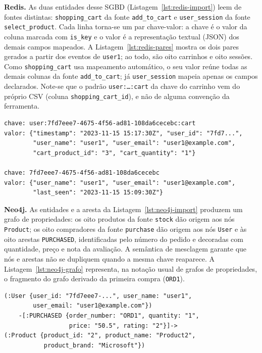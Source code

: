 \textbf{Redis.} As duas entidades desse SGBD (Listagem~\ref{lst:redis-import}) leem de
fontes distintas: \texttt{shopping\_cart} da fonte \texttt{add\_to\_cart} e
\texttt{user\_session} da fonte \texttt{select\_product}. Cada linha torna-se um par
chave-valor: a chave é o valor da coluna marcada com \texttt{is\_key} e o valor é a
representação textual (JSON) dos demais campos mapeados. A Listagem~\ref{lst:redis-pares}
mostra os dois pares gerados a partir dos eventos de \texttt{user1}; ao todo, são oito
carrinhos e oito sessões. Como \texttt{shopping\_cart} usa mapeamento automático, o seu
valor reúne todas as demais colunas da fonte \texttt{add\_to\_cart}; já
\texttt{user\_session} mapeia apenas os campos declarados. Note-se que o padrão
\texttt{user:\ldots:cart} da chave do carrinho vem do próprio CSV (coluna
\texttt{shopping\_cart\_id}), e não de alguma convenção da ferramenta.

\begin{lstlisting}[style=textstyle,caption={Pares chave-valor gerados no Redis a partir dos eventos de \texttt{user1}.},label={lst:redis-pares}]
chave: user:7fd7eee7-4675-4f56-ad81-108da6cecebc:cart
valor: {"timestamp": "2023-11-15 15:17:30Z", "user_id": "7fd7...",
        "user_name": "user1", "user_email": "user1@example.com",
        "cart_product_id": "3", "cart_quantity": "1"}

chave: 7fd7eee7-4675-4f56-ad81-108da6cecebc
valor: {"user_name": "user1", "user_email": "user1@example.com",
        "last_seen": "2023-11-15 15:09:30Z"}
\end{lstlisting}

\textbf{Neo4j.} As entidades e a aresta da Listagem~\ref{lst:neo4j-import} produzem um
grafo de propriedades: os oito produtos da fonte \texttt{stock} dão origem aos nós
\texttt{Product}; os oito compradores da fonte \texttt{purchase} dão origem aos nós
\texttt{User} e às oito arestas \texttt{PURCHASED}, identificadas pelo número do pedido e
decoradas com quantidade, preço e nota da avaliação. A semântica de mesclagem garante que
nós e arestas não se dupliquem quando a mesma chave reaparece. A
Listagem~\ref{lst:neo4j-grafo} representa, na notação usual de grafos de propriedades, o
fragmento do grafo derivado da primeira compra (\texttt{ORD1}).

\begin{lstlisting}[style=textstyle,caption={Fragmento do grafo materializado no Neo4j para o pedido \texttt{ORD1}.},label={lst:neo4j-grafo}]
(:User {user_id: "7fd7eee7-...", user_name: "user1",
        user_email: "user1@example.com"})
    -[:PURCHASED {order_number: "ORD1", quantity: "1",
                  price: "50.5", rating: "2"}]->
(:Product {product_id: "2", product_name: "Product2",
           product_brand: "Microsoft"})
\end{lstlisting}

